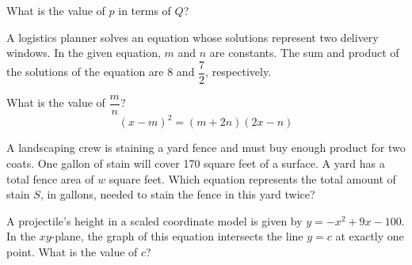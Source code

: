 What is the value of \(p\) in terms of \(Q\)?

\vspace{0.75em}


\vspace{2em}
\newpage

\noindent\markforreview
\vspace{1em}

A logistics planner solves an equation whose solutions represent two delivery windows. In the given equation, \(m\) and \(n\) are constants. The sum and product of the solutions of the equation are 8 and \(\dfrac{7}{2}\), respectively.

What is the value of \(\dfrac{m}{n}\)?
\[
(x - m)^2 = (m + 2n)(2x - n)
\]

\vspace{0.75em}


\vspace{2em}
\newpage

\noindent\markforreview
\vspace{1em}

A landscaping crew is staining a yard fence and must buy enough product for two coats. One gallon of stain will cover 170 square feet of a surface. A yard has a total fence area of \(w\) square feet.
Which equation represents the total amount of stain \(S\), in gallons, needed to stain the fence in this yard twice?

\vspace{0.75em}


\vspace{2em}
\newpage

\noindent\markforreview
\vspace{1em}

A projectile’s height in a scaled coordinate model is given by \(y = -x^2 + 9x - 100\). In the \(xy\)-plane, the graph of this equation intersects the line \(y = c\) at exactly one point. What is the value of \(c\)?

\vspace{0.75em}


\vspace{2em}
\newpage
